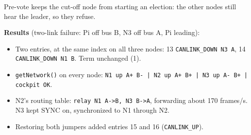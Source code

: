 \documentclass[10pt]{article}
\begin{document}
Pre-vote keeps the cut-off node from starting an election: the other nodes still hear the leader, so they refuse.

\textbf{Results} (two-link failure: Pi off bus B, N3 off bus A, Pi leading):
\begin{itemize}
  \item Two entries, at the same index on all three nodes: 13 \texttt{CANLINK\_DOWN N3 A}, 14 \texttt{CANLINK\_DOWN N1 B}. Term unchanged (1).
  \item \texttt{getNetwork()} on every node: \texttt{N1 up A+ B- | N2 up A+ B+ | N3 up A- B+ | cockpit OK}.
  \item N2's routing table: \texttt{relay N1 A->B, N3 B->A}, forwarding about 170 frames/s. N3 kept SYNC on, synchronized to N1 through N2.
  \item Restoring both jumpers added entries 15 and 16 (\texttt{CANLINK\_UP}).
\end{itemize}
\end{document}
